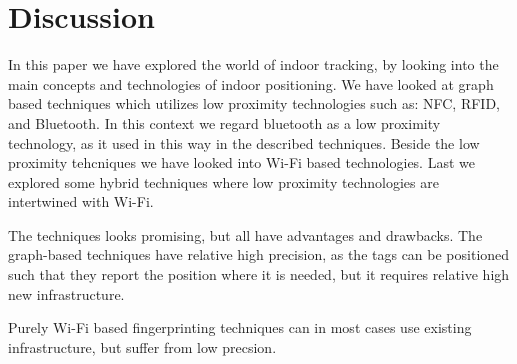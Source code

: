 \section{Discussion}
In this paper we have explored the world of indoor tracking, by looking into the main concepts and technologies of indoor positioning. 
We have looked at graph based techniques which utilizes low proximity technologies  such as: NFC, RFID, and Bluetooth. 
In this context we regard bluetooth as a low proximity technology, as it used in this way in the described techniques. 
Beside the low proximity tehcniques we have looked into Wi-Fi based technologies.
Last we explored some hybrid techniques where low proximity technologies are intertwined with Wi-Fi. 

The techniques looks promising, but all have advantages and drawbacks. 
The graph-based techniques have relative high precision, as the tags can be positioned such that they report the position where it is needed, but it requires relative high new infrastructure. 

Purely Wi-Fi based fingerprinting techniques can in most cases use existing infrastructure, but suffer from low precsion.

